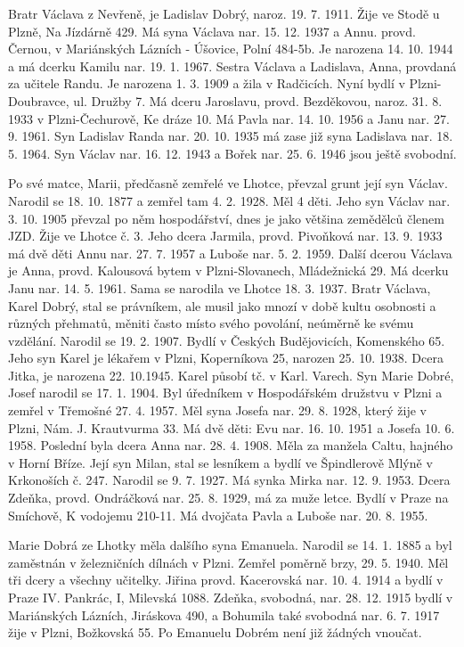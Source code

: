 \documentclass[../dejiny-rodu-prusiku.tex]{subfiles}
\begin{document}
Bratr Václava z Nevřeně, je Ladislav Dobrý, naroz. 19. 7. 1911. Žije ve Stodě u Plzně, Na Jízdárně 429. Má syna Václava nar. 15. 12. 1937 a Annu. provd. Černou, v Mariánských Lázních - Úšovice, Polní 484-5b. Je narozena 14. 10. 1944 a má dcerku Kamilu nar. 19. 1. 1967. Sestra Václava a Ladislava, Anna, provdaná za učitele Randu. Je narozena 1. 3. 1909 a žila v Radčicích. Nyní bydlí v Plzni-Doubravce, ul. Družby 7. Má dceru Ja­roslavu, provd. Bezděkovou, naroz. 31. 8. 1933 v Plzni-Čechurově, Ke dráze 10. Má Pavla nar. 14. 10. 1956 a Janu nar. 27. 9. 1961. Syn Ladislav Randa nar. 20. 10. 1935 má zase již syna Ladislava nar. 18. 5. 1964. Syn Václav nar. 16. 12. 1943 a Bořek nar. 25. 6. 1946 jsou ještě svobodní.

Po své matce, Marii, předčasně zemřelé ve Lhotce, převzal grunt její syn Václav. Narodil se 18. 10. 1877 a zemřel tam 4. 2. 1928. Měl 4 děti. Jeho syn Václav nar. 3. 10. 1905 převzal po něm hospodářství, dnes je jako většina země­dělců členem JZD. Žije ve Lhotce č. 3. Jeho dcera Jarmila, provd. Pivoňková nar. 13. 9. 1933 má dvě děti Annu nar. 27. 7. 1957 a Luboše nar. 5. 2. 1959. Další dcerou Václava je Anna, provd. Kalousová bytem v Plzni-Slovanech, Mládežnická 29. Má dcerku Janu nar. 14. 5. 1961. Sama se narodila ve Lhot­ce 18. 3. 1937. Bratr Václava, Karel Dobrý, stal se právníkem, ale musil jako mnozí v době kultu osobnosti a růz­ných přehmatů, měniti často místo svého povolání, neúměr­ně ke svému vzdělání. Narodil se 19. 2. 1907. Bydlí v Českých Budějovicích, Komenského 65. Jeho syn Karel je lékařem v Plzni, Koperníkova 25, narozen 25. 10. 1938. Dcera Jitka, je narozena 22. 10.1945. Karel působí tč. v Karl. Varech. Syn Marie Dobré, Josef narodil se 17. 1. 1904. Byl úřední­kem v Hospodářském družstvu v Plzni a zemřel v Třemošné 27. 4. 1957. Měl syna Josefa nar. 29. 8. 1928, který žije v Plzni, Nám. J. Krautvurma 33. Má dvě děti: Evu nar. 16. 10. 1951 a Josefa 10. 6. 1958. Poslední byla dcera Anna nar. 28. 4. 1908. Měla za manžela Caltu, hajného v Horní Bříze. Její syn Milan, stal se les­níkem a bydlí ve Špindlerově Mlýně v Krkonoších č. 247. Narodil se 9. 7. 1927. Má synka Mirka nar. 12. 9. 1953. Dce­ra Zdeňka, provd. Ondráčková nar. 25. 8. 1929, má za muže letce. Bydlí v Praze na Smíchově, K vodojemu 210-11. Má dvojčata Pavla a Luboše nar. 20. 8. 1955.

Marie Dobrá ze Lhotky měla dalšího syna Emanuela. Narodil se 14. 1. 1885 a byl zaměstnán v železničních dílnách v Plzni. Zemřel poměrně brzy, 29. 5. 1940. Měl tři dcery a všechny učitelky. Jiřina provd. Kacerovská nar. 10. 4. 1914 a bydlí v Praze IV. Pankrác, I, Milevská 1088. Zdeňka, svobodná, nar. 28. 12. 1915 bydlí v Mariánských Lázních, Jiráskova 490, a Bohumila také svobodná nar. 6. 7. 1917 žije v Plzni, Božkovská 55. Po Emanuelu Dobrém není již žádných vnoučat.
\end{document}
